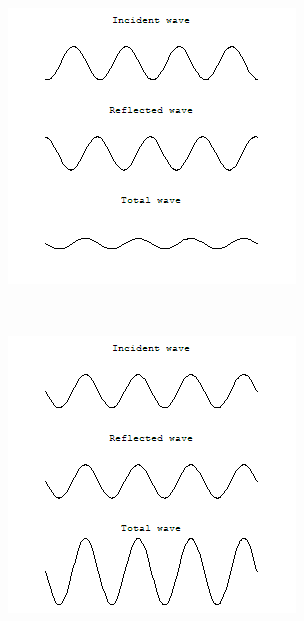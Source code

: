 \documentclass[12pt,a4paper,titlepage,final]{report}
\begin{document}
\begin{figure}[!h]
\begin{subfigure}[b]{0.23\textwidth}
                \caption{}
                \label{fig:standing_wave:frame_2}
        \end{subfigure}
        ~ %
        \begin{subfigure}[b]{0.23\textwidth}
                \includegraphics[width=\textwidth]{sin-3}
                \caption{}
                \label{fig:standing_wave:frame_3}
        \end{subfigure}
        ~ %
        \begin{subfigure}[b]{0.23\textwidth}
                \includegraphics[width=\textwidth]{sin-4}

\end{subfigure}
\end{figure}
\end{document}
